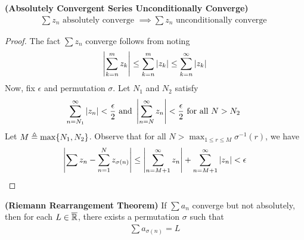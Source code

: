 \documentclass{report}
\begin{document}
\begin{theorem}
\label{ACSUC}
\textbf{(Absolutely Convergent Series Unconditionally Converge)} 
\begin{align*}
\sum z_n\text{ absolutely converge }\implies \sum z_n\text{ unconditionally converge }
\end{align*}
\end{theorem}
\begin{proof}
The fact $\sum z_n$ converge  follows from noting 
\begin{align*}
  \left|\sum_{k=n}^mz_k\right|\leq \sum_{k=n}^m \left|z_k\right|\leq \sum_{k=n}^{\infty} \left|z_k\right|
\end{align*}
Now, fix $\epsilon $ and permutation $\sigma$. Let $N_1$ and $N_2$ satisfy 
\begin{align*}   
\sum_{n=N_1}^{\infty}\left|z_n\right|<\frac{\epsilon}{2}\text{ and }\left|\sum_{n=N}^{\infty}z_n\right|<\frac{\epsilon}{2}\text{ for all $N>N_2$ }
\end{align*}
Let $M\triangleq \max \{ N_1,N_2 \}$. Observe that for all  $N> \max_{1\leq r\leq M} \sigma^{-1}(r)$, we have 
\begin{align*}
\left|\sum z_n - \sum_{n=1}^N z_{\sigma (n)}\right|\leq \left|\sum_{n=M+1}^{\infty} z_n \right|+ \sum_{n=M+1}^{\infty} \left|z_n\right|<\epsilon 
\end{align*}
\end{proof}
\begin{theorem}
\label{RRT}
\textbf{(Riemann Rearrangement Theorem)} If $\sum a_n$ converge but not absolutely, then for each $L\in\overline{\mathbb{R}}$, there exists a permutation $\sigma$ such that 
\begin{align*}
\sum a_{\sigma (n)}=L
\end{align*}
\end{theorem}
\end{document}
